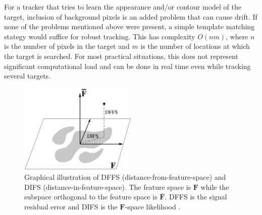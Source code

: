 For a tracker that tries to learn the appearance and/or contour model of the target, inclusion of background pixels is an added problem that can cause drift.  If none of the problems mentioned above were present, a simple template matching stategy would suffice for robust tracking.  This has complexity $O(nm)$, where $n$ is the number of pixels in the target and $m$ is the number of locations at which the target is searched.  For most practical situations, this does not represent significant computational load and can be done in real time even while tracking several targets.
								\begin{figure}[t]
								\centering
								\includegraphics[width=0.5\textwidth]{thesis/1998_JNL_ProbVisLearning_Moghaddam_fig3.png}
								\caption{Graphical illustration of DFFS (distance-from-feature-space) and DIFS (distance-in-feature-space).  The feature space is $\mathbf{F}$ while the subspace orthogonal to the feature space is $\bar{\mathbf{F}}$.  DFFS is the signal residual error and DIFS is the $\mathbf{F}$-space likelihood \cite{1997_JNL_EigenTRK_Moghaddam}.}
					\label{fig:1997_JNL_DIFSDFFS_Moghaddam}
								\end{figure}


